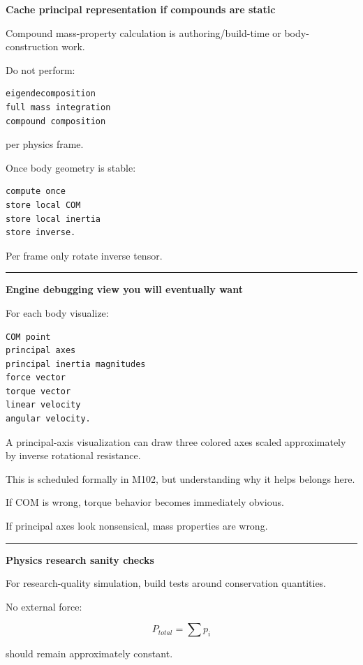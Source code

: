 \textbf{Cache principal representation if compounds are static}

Compound mass-property calculation is authoring/build-time or body-construction work.

Do not perform:

\begin{verbatim}
eigendecomposition
full mass integration
compound composition
\end{verbatim}

per physics frame.

Once body geometry is stable:

\begin{verbatim}
compute once
store local COM
store local inertia
store inverse.
\end{verbatim}

Per frame only rotate inverse tensor.

\begin{center}\rule{0.5\linewidth}{0.5pt}\end{center}

\textbf{Engine debugging view you will eventually want}

For each body visualize:

\begin{verbatim}
COM point
principal axes
principal inertia magnitudes
force vector
torque vector
linear velocity
angular velocity.
\end{verbatim}

A principal-axis visualization can draw three colored axes scaled approximately by inverse rotational resistance.

This is scheduled formally in M102, but understanding why it helps belongs here.

If COM is wrong, torque behavior becomes immediately obvious.

If principal axes look nonsensical, mass properties are wrong.

\begin{center}\rule{0.5\linewidth}{0.5pt}\end{center}

\textbf{Physics research sanity checks}

For research-quality simulation, build tests around conservation quantities.

No external force:

\[
P_{total}
=
\sum p_i
\]

should remain approximately constant.

